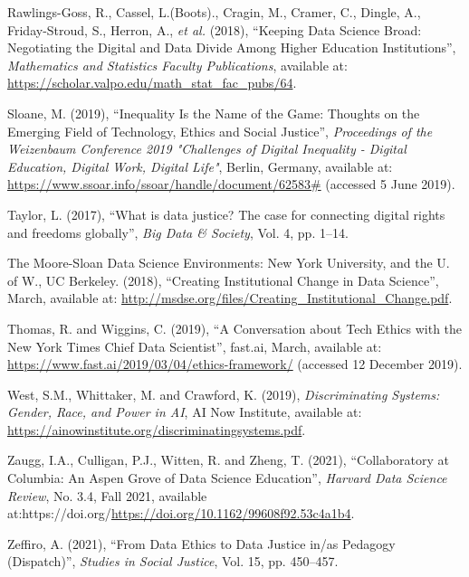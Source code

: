 \documentclass[
]{article}
\newlength{\cslhangindent}
\newlength{\cslentryspacingunit} %
\newenvironment{CSLReferences}[2] %
 {%
  \setlength{\parindent}{0pt}
  \ifodd #1
  \let\oldpar\par
  \def\par{\hangindent=\cslhangindent\oldpar}
  \fi
  \setlength{\parskip}{#2\cslentryspacingunit}
 }%
 {}
\begin{document}
\begin{CSLReferences}{1}{0}
\leavevmode{}%
Rawlings-Goss, R., Cassel, L.(Boots)., Cragin, M., Cramer, C., Dingle,
A., Friday-Stroud, S., Herron, A., \emph{et al.} (2018), {``Keeping
{Data} {Science} {Broad}: {Negotiating} the {Digital} and {Data}
{Divide} {Among} {Higher} {Education} {Institutions}''},
\emph{Mathematics and Statistics Faculty Publications}, available at:
\url{https://scholar.valpo.edu/math_stat_fac_pubs/64}.

\leavevmode{}%
Sloane, M. (2019), {``Inequality {Is} the {Name} of the {Game}:
{Thoughts} on the {Emerging} {Field} of {Technology}, {Ethics} and
{Social} {Justice}''}, \emph{Proceedings of the {Weizenbaum}
{Conference} 2019 "{Challenges} of {Digital} {Inequality} - {Digital}
{Education}, {Digital} {Work}, {Digital} {Life}"}, Berlin, Germany,
available at: \url{https://www.ssoar.info/ssoar/handle/document/62583\#}
(accessed 5 June 2019).

\leavevmode{}%
Taylor, L. (2017), {``What is data justice? {The} case for connecting
digital rights and freedoms globally''}, \emph{Big Data \& Society},
Vol. 4, pp. 1--14.

\leavevmode{}%
The Moore-Sloan Data Science Environments: New York University, and the
U. of W., UC Berkeley. (2018), {``Creating {Institutional} {Change} in
{Data} {Science}''}, March, available at:
\url{http://msdse.org/files/Creating_Institutional_Change.pdf}.

\leavevmode{}%
Thomas, R. and Wiggins, C. (2019), {``A {Conversation} about {Tech}
{Ethics} with the {New} {York} {Times} {Chief} {Data} {Scientist}''},
fast.ai, March, available at:
\url{https://www.fast.ai/2019/03/04/ethics-framework/} (accessed 12
December 2019).

\leavevmode{}%
West, S.M., Whittaker, M. and Crawford, K. (2019), \emph{Discriminating
{Systems}: {Gender}, {Race}, and {Power} in {AI}}, AI Now Institute,
available at:
\url{https://ainowinstitute.org/discriminatingsystems.pdf}.

\leavevmode{}%
Zaugg, I.A., Culligan, P.J., Witten, R. and Zheng, T. (2021),
{``Collaboratory at {Columbia}: {An} {Aspen} {Grove} of {Data} {Science}
{Education}''}, \emph{Harvard Data Science Review}, No. 3.4, Fall 2021,
available
at:https://doi.org/\url{https://doi.org/10.1162/99608f92.53c4a1b4}.

\leavevmode{}%
Zeffiro, A. (2021), {``From {Data} {Ethics} to {Data} {Justice} in/as
{Pedagogy} ({Dispatch})''}, \emph{Studies in Social Justice}, Vol. 15,
pp. 450--457.

\end{CSLReferences}
\end{document}
